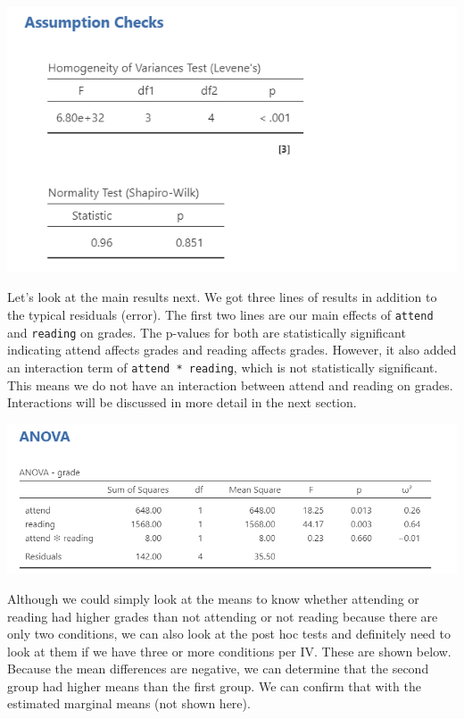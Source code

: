 \documentclass[
]{book}
\begin{document}
\includegraphics{images/06-factorial-anova/independent-factorial_assumptions.png}

Let's look at the main results next. We got three lines of results in addition to the typical residuals (error). The first two lines are our main effects of \texttt{attend} and \texttt{reading} on grades. The p-values for both are statistically significant indicating attend affects grades and reading affects grades. However, it also added an interaction term of \texttt{attend\ *\ reading}, which is not statistically significant. This means we do not have an interaction between attend and reading on grades. Interactions will be discussed in more detail in the next section.

\includegraphics{images/06-factorial-anova/independent-factorial_results.png}

Although we could simply look at the means to know whether attending or reading had higher grades than not attending or not reading because there are only two conditions, we can also look at the post hoc tests and definitely need to look at them if we have three or more conditions per IV. These are shown below. Because the mean differences are negative, we can determine that the second group had higher means than the first group. We can confirm that with the estimated marginal means (not shown here).
\end{document}
